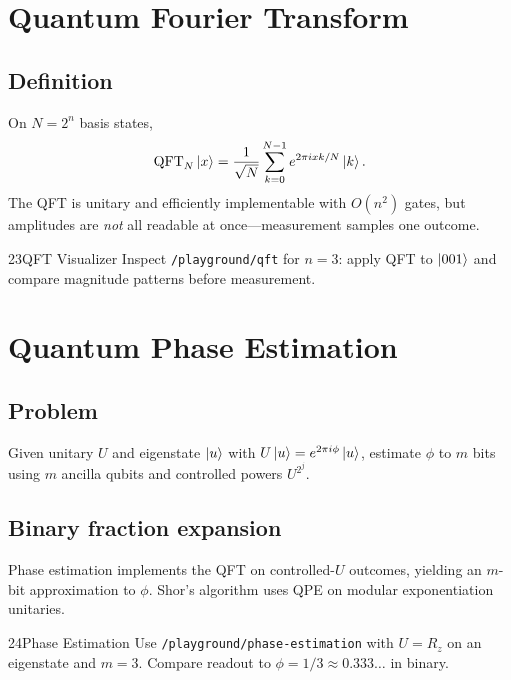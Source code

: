 \section{Quantum Fourier Transform}
\label{sec:qft}

\subsection{Definition}

On $N=2^n$ basis states,
\begin{equation}
\mathrm{QFT}_N\ket{x}=\frac{1}{\sqrt{N}}\sum_{k=0}^{N-1} e^{2\pi i xk/N}\ket{k}.
\label{eq:qft}
\end{equation}
The QFT is unitary and efficiently implementable with $O(n^2)$ gates, but amplitudes are \emph{not} all readable at once---measurement samples one outcome.

\begin{labbox}{23}{QFT Visualizer}
Inspect \texttt{/playground/qft} for $n=3$: apply QFT to $\ket{001}$ and compare magnitude patterns before measurement.
\end{labbox}

\section{Quantum Phase Estimation}
\label{sec:qpe}

\subsection{Problem}

Given unitary $U$ and eigenstate $\ket{u}$ with $U\ket{u}=e^{2\pi i\phi}\ket{u}$, estimate $\phi$ to $m$ bits using $m$ ancilla qubits and controlled powers $U^{2^j}$.

\subsection{Binary fraction expansion}

Phase estimation implements the QFT on controlled-$U$ outcomes, yielding an $m$-bit approximation to $\phi$. Shor's algorithm uses QPE on modular exponentiation unitaries.

\begin{labbox}{24}{Phase Estimation}
Use \texttt{/playground/phase-estimation} with $U=R_z$ on an eigenstate and $m=3$. Compare readout to $\phi=1/3\approx 0.333\ldots$ in binary.
\end{labbox}

